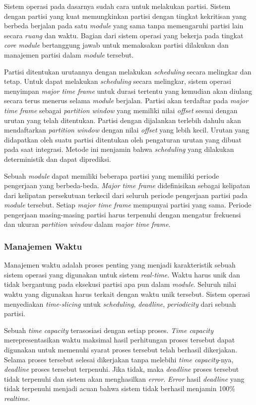 Sistem operasi pada dasarnya sudah cara untuk melakukan partisi.
Sistem dengan partisi yang kuat memungkinkan partisi dengan tingkat kekritisan yang berbeda berjalan pada satu \textit{module} yang sama tanpa memengaruhi partisi lain secara \textit{ruang} dan waktu.
Bagian dari sistem operasi yang bekerja pada tingkat \textit{core module} bertanggung jawab untuk memaksakan partisi dilakukan dan manajemen partisi dalam \textit{module} tersebut.

Partisi ditentukan urutannya dengan melakukan \textit{scheduling} secara melingkar dan tetap.
Untuk dapat melakukan \textit{scheduling} secara melingkar, sistem operasi menyimpan \textit{major time frame} untuk durasi tertentu yang kemudian akan diulang secara terus menerus selama \textit{module} berjalan.
Partisi akan terdaftar pada \textit{major time frame} sebagai \textit{partition window} yang memiliki nilai \textit{offset} sesuai dengan urutan yang telah ditentukan.
Partisi dengan dijalankan terlebih dahulu akan mendaftarkan \textit{partition window} dengan nilai \textit{offset} yang lebih kecil.
Urutan yang didapatkan oleh suatu partisi ditentukan oleh pengaturan urutan yang dibuat pada saat integrasi.
Metode ini menjamin bahwa \textit{scheduling} yang dilakukan deterministik dan dapat diprediksi.

Sebuah \textit{module} dapat memiliki beberapa partisi yang memiliki periode pengerjaan yang berbeda-beda.
\textit{Major time frame} didefinisikan sebagai kelipatan dari kelipatan persekutuan terkecil dari seluruh periode pengerjaan partisi pada \textit{module} tersebut.
Setiap \textit{major time frame} mempunyai partisi yang sama.
Periode pengerjaan masing-masing partisi harus terpenuhi dengan mengatur frekuensi dan ukuran \textit{partition window} dalam \textit{major time frame}.

\subsubsection{Manajemen Waktu}

Manajemen waktu adalah proses penting yang menjadi karakteristik sebuah sistem operasi yang digunakan untuk sistem \textit{real-time}.
Waktu harus unik dan tidak bergantung pada eksekusi partisi apa pun dalam \textit{module}.
Seluruh nilai waktu yang digunakan harus terkait dengan waktu unik tersebut.
Sistem operasi menyediakan \textit{time-slicing} untuk \textit{scheduling}, \textit{deadline}, \textit{periodicity} dari sebuah partisi.

Sebuah \textit{time capacity} terasosiasi dengan setiap proses.
\textit{Time capacity} merepresentasikan waktu maksimal hasil perhitungan proses tersebut dapat digunakan untuk memenuhi syarat proses tersebut telah berhasil dikerjakan.
Selama proses tersebut selesai dikerjakan tanpa melebihi \textit{time capacity}-nya, \textit{deadline} proses tersebut terpenuhi. Jika tidak, maka \textit{deadline} proses tersebut tidak terpenuhi dan sistem akan menghasilkan \textit{error}.
\textit{Error} hasil \textit{deadline} yang tidak terpenuhi menjadi acuan bahwa sistem tidak berhasil menjamin 100\% \textit{realtime}.


